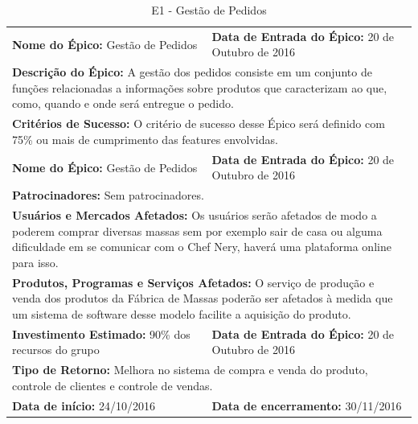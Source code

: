 \begin{table}[]
\centering
\caption{E1 - Gestão de Pedidos}
\label{my-label}
\begin{tabular}{|p{7cm}|p{8cm}|}
\cline{1-2}
\textbf{Nome do Épico:} Gestão de Pedidos &  \textbf{Data de Entrada do Épico:} 20 de Outubro de 2016\\ \cline{1-2}
\multicolumn{2}{|p{15cm}|}{ \textbf{Descrição do Épico:} A gestão dos pedidos consiste em um conjunto de funções relacionadas  a informações sobre produtos que caracterizam ao que, como, quando e onde será entregue o pedido.} \\ \cline{1-2}
\multicolumn{2}{|p{15cm}|}{\textbf{Critérios de Sucesso:} O critério de sucesso desse Épico será definido com 75\% ou mais de cumprimento das features envolvidas.} \\ \cline{1-2}
\textbf{Nome do Épico:} Gestão de Pedidos &  \textbf{Data de Entrada do Épico:} 20 de Outubro de 2016\\ \cline{1-2}
\multicolumn{2}{|p{15cm}|}{ \textbf{Patrocinadores:} Sem patrocinadores.} \\ \cline{1-2}
\multicolumn{2}{|p{15cm}|}{ \textbf{Usuários e Mercados Afetados:} Os usuários serão afetados de modo a poderem comprar diversas massas sem por exemplo sair de casa ou alguma dificuldade em se comunicar com o Chef Nery, haverá uma plataforma online para isso.} \\ \cline{1-2}
\multicolumn{2}{|p{15cm}|}{ \textbf{Produtos, Programas e Serviços Afetados:} O serviço de produção e venda dos produtos da Fábrica de Massas poderão ser afetados à medida que um sistema de software desse modelo facilite a aquisição do produto. } \\ \cline{1-2}
\textbf{Investimento Estimado: }90\% dos recursos do grupo &  \textbf{Data de Entrada do Épico:} 20 de Outubro de 2016\\ \cline{1-2}
\multicolumn{2}{|p{15cm}|}{\textbf{Tipo de Retorno:} Melhora no sistema de compra e venda do produto, controle de clientes e controle de vendas.} \\ \cline{1-2}
\textbf{Data de início:} 24/10/2016 & \textbf{Data de encerramento:} 30/11/2016\\ \cline{1-2}
\end{tabular}
\end{table}

\tab \\ \\ \\


